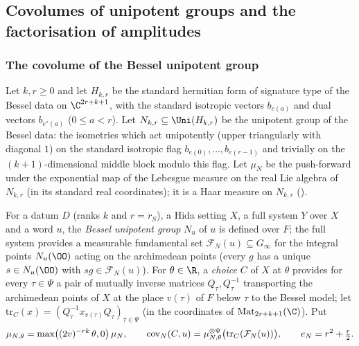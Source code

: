 \subsection{Covolumes of unipotent groups and the factorisation of amplitudes}\label{sec:pf:sh-flag:cov}

\subsubsection{The covolume of the Bessel unipotent group}

\begin{definition}\label{pf:sh-flag:defcovn}
Let $k,r\ge0$ and let $H_{k,r}$ be the standard hermitian form of signature type of the Bessel data on $\C^{2r+k+1}$, with
the standard isotropic vectors $b_{e(a)}$ and dual vectors $b_{e^*(a)}$ ($0\le a<r$). Let $N_{k,r}\subseteq\Uni(H_{k,r})$
be the unipotent group of the Bessel data: the isometries which act unipotently (upper triangularly with diagonal
$1$) on the standard isotropic flag $b_{e(0)},\dots,b_{e(r-1)}$ and trivially on the $(k+1)$-dimensional middle block
modulo this flag. Let $\mu_N$ be the push-forward under the exponential map of the Lebesgue measure on the real Lie
algebra of $N_{k,r}$ (in its standard real coordinates); it is a Haar measure on $N_{k,r}$
().

For a datum $D$ (ranks $k$ and $r=r_S$), a Hida setting $X$, a full system $Y$ over $X$ and a word $u$, the
\emph{Bessel unipotent group} $N_u$ of $u$ is defined over $F$; the full system provides a measurable fundamental set
$\mathcal F_N(u)\subseteq G_\infty$ for the integral points $N_u(\OO)$ acting on the archimedean points (every $g$ has a
unique $s\in N_u(\OO)$ with $sg\in\mathcal F_N(u)$). For $\theta\in\R$, a \emph{choice} $C$ of $X$ at $\theta$ provides for
every $\tau\in\Psi$ a pair of mutually inverse matrices $Q_\tau,Q_\tau^{-1}$ transporting the archimedean points of
$X$ at the place $v(\tau)$ of $F$ below $\tau$ to the Bessel model; let $\mathrm{tr}_C(x)=(Q_\tau^{-1}x_{v(\tau)}Q_\tau)_{\tau\in
\Psi}$ (in the coordinates of $\mathrm{Mat}_{2r+k+1}(\C)$). Put
\[
\mu_{N,\theta}=\max\bigl((2v)^{-rk}\,\theta,0\bigr)\,\mu_N,\qquad
\operatorname{cov}_N(C,u)=\mu_{N,\theta}^{\otimes\Psi}\bigl(\mathrm{tr}_C(\mathcal F_N(u))\bigr),\qquad e_N=r^2+\tfrac r2 .
\]
\end{definition}

